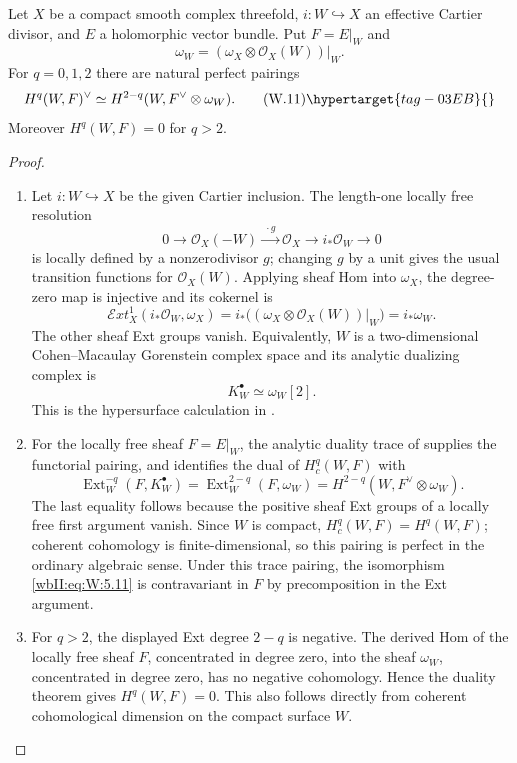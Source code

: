 \begin{theorem}
\hypertarget{tag-03IY}{}\label{wbII:thm:cartier-duality}

Let $X$ be a compact smooth complex threefold,
$i:W\hookrightarrow X$ an effective Cartier divisor, and $E$ a holomorphic
vector bundle.  Put $F=E|_W$ and
\[
\omega_W=(\omega_X\otimes\mathcal O_X(W))|_W.
\]
For $q=0,1,2$ there are natural perfect pairings
\[
H^q(W,F)^\vee
\simeq H^{2-q}(W,F^\vee\otimes\omega_W).
\tag{W.11}\hypertarget{tag-03EB}{}\label{wbII:eq:W:5.11}
\]
Moreover $H^q(W,F)=0$ for $q>2$.
\end{theorem}



\begin{proof}

\begin{enumerate}[label=\arabic*.,leftmargin=*]
\item Let \(i:W\hookrightarrow X\) be the given Cartier inclusion.  The
length-one locally free resolution
\[
 0\longrightarrow\mathcal O_X(-W)
 \xrightarrow{\;\cdot g\;}\mathcal O_X
 \longrightarrow i_*\mathcal O_W\longrightarrow0
\]
is locally defined by a nonzerodivisor \(g\); changing \(g\) by a unit
gives the usual transition functions for \(\mathcal O_X(W)\).
Applying sheaf Hom into \(\omega_X\), the degree-zero map is
injective and its cokernel is
\[
 \mathcal E xt^1_X(i_*\mathcal O_W,\omega_X)
 =i_*\bigl((\omega_X\otimes\mathcal O_X(W))|_W\bigr)
 =i_*\omega_W.
\]
The other sheaf Ext groups vanish.  Equivalently, \(W\) is a
two-dimensional Cohen--Macaulay Gorenstein complex space and its
analytic dualizing complex is
\[
 K_W^\bullet\simeq\omega_W[2].
\]
This is the hypersurface calculation in
\cite[Proposition~2 and pp.~90--91]{RR70push}.

\item For the locally free sheaf \(F=E|_W\), the analytic duality trace of
\cite[Theorem~2, pp.~82--83]{RR70push} supplies the
functorial pairing, and identifies the dual of \(H_c^q(W,F)\) with
\[
 \operatorname{Ext}^{-q}_W(F,K_W^\bullet)
 =\operatorname{Ext}^{2-q}_W(F,\omega_W)
 =H^{2-q}(W,F^\vee\otimes\omega_W).
\]
The last equality follows because the positive sheaf Ext groups
of a locally free first argument vanish.  Since \(W\) is compact,
\(H_c^q(W,F)=H^q(W,F)\); coherent cohomology is finite-dimensional,
so this pairing is perfect in the ordinary algebraic sense.
Under this trace pairing, the isomorphism
\eqref{wbII:eq:W:5.11} is contravariant in \(F\) by precomposition in the Ext
argument.

\item For \(q>2\), the displayed Ext degree \(2-q\) is negative.  The
derived Hom of the locally free sheaf \(F\), concentrated in degree
zero, into the sheaf \(\omega_W\), concentrated in degree zero, has
no negative cohomology.  Hence the duality theorem gives
\(H^q(W,F)=0\).  This also follows directly from coherent
cohomological dimension on the compact surface \(W\).

\end{enumerate}
\end{proof}